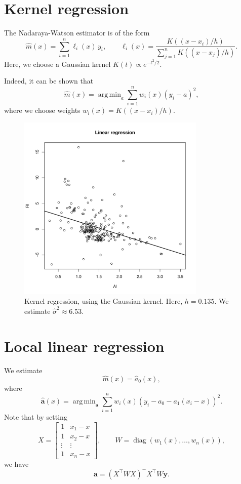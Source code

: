 \documentclass[10pt]{article}
\DeclareMathOperator*{\argmin}{arg\,min}
\begin{document}
    \section{Kernel regression}

    The Nadaraya-Watson estimator is of the form \[
        \widehat{m}(x) = \sum_{i = 1}^n \ell_i(x)\, y_i, \qquad
        \ell_i(x) = \frac{K((x - x_i) / h)}{\sum_{j = 1}^n K((x - x_j) / h)}.
    \] Here, we choose a Gaussian kernel $K(t) \propto e^{-t^2 / 2}$.

    Indeed, it can be shown that \[
        \widehat{m}(x) = \argmin_a \sum_{i = 1}^n w_i(x) (y_i - a)^2,
    \] where we choose weights $w_i(x) = K((x - x_i) / h)$.

    \begin{figure}[H]
    \begin{center}
        \includegraphics[page = 3, width = 0.8\textwidth]{glass.pdf}
    \end{center}
    \caption{
        Kernel regression, using the Gaussian kernel. Here, $h = 0.135$.
        We estimate $\widehat{\sigma}^2 \approx 6.53$.
    }
    \label{fig:glass_kernel}
    \end{figure}


    \section{Local linear regression}

    We estimate \[
        \widehat{m}(x) = \widehat{a}_0(x),
    \] where \[
        \widehat{\bm{a}}(x) = \argmin_{\bm{a}} \sum_{i = 1}^n
                w_i(x) (y_i - a_0 - a_1(x_i - x))^2.
    \] Note that by setting \[
        X = \begin{bmatrix}
            1 & x_1 - x \\
            1 & x_2 - x \\
            \vdots & \vdots \\
            1 & x_n  - x
        \end{bmatrix}, \qquad
        W = \operatorname{diag}(w_1(x), \dots, w_n(x)),
    \] we have \[
        \widehat{\bm{a}} = (X^\top W X)^- X^\top W \bm{y}.
    \]
\end{document}
